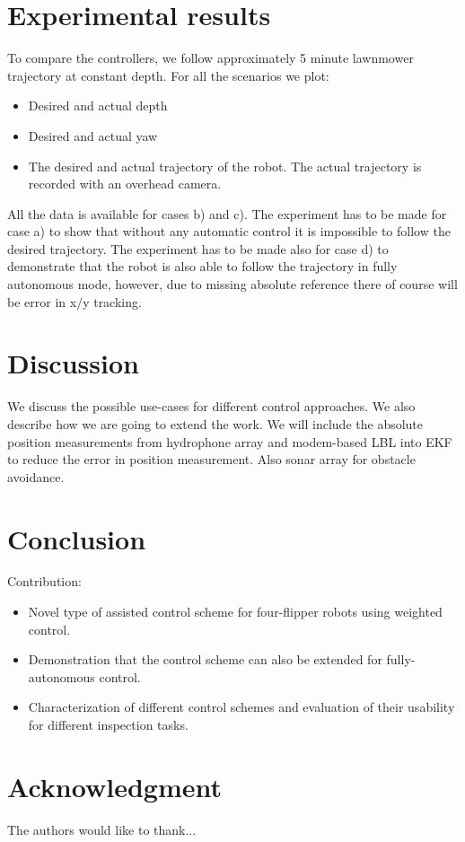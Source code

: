 \documentclass[conference]{IEEEtran}
\begin{document}
\section{Experimental results}
To compare the controllers, we follow approximately 5 minute lawnmower trajectory at constant depth. For all the scenarios we plot:

\begin{itemize}
	\item
Desired and actual depth
	\item
Desired and actual yaw
	\item
The desired and actual trajectory of the robot. 
The actual trajectory is recorded with an overhead camera.
\end{itemize}

All the data is available for cases b) and c). The experiment has to be made for case a) to show that without any automatic control it is impossible to follow the desired trajectory. The experiment has to be made also for case d) to demonstrate that the robot is also able to follow the trajectory in fully autonomous mode, however, due to missing absolute reference there of course will be error in x/y tracking.


\section{Discussion}
We discuss the possible use-cases for different control approaches. We also describe how we are going to extend the work. We will include the absolute position measurements from hydrophone array and modem-based LBL into EKF to reduce the error in position measurement. Also sonar array for obstacle avoidance. 


\section{Conclusion}
Contribution:
\begin{itemize}
	\item Novel type of assisted control scheme for four-flipper robots using weighted control.
	\item Demonstration that the control scheme can also be extended for fully-autonomous control.
	\item Characterization of different control schemes and evaluation of their usability for different inspection tasks.
\end{itemize}

\section*{Acknowledgment}


The authors would like to thank...



\end{document}
